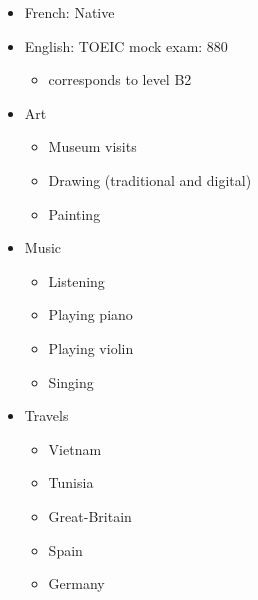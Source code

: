 \documentclass[a4paper,table]{twentysecondcv}
\begin{document}
{  \begin{itemize}[leftmargin=1mm]
    \setlength\itemsep{-5pt}
    \item French: Native
    \item English: TOEIC mock exam: 880
      \vspace{-5pt}
    \begin{itemize}
      \setlength\itemsep{-5pt}
      \item corresponds to level B2
    \end{itemize}
  \end{itemize}
  \begin{flushleft}
  \begin{itemize}[leftmargin=1mm]
    \setlength\itemsep{-5pt}
    \item Art
    \vspace{-5pt}
    \begin{itemize}
      \item Museum visits
      \item Drawing (traditional and digital)
      \item Painting
    \end{itemize}
    \item Music
    \vspace{-5pt}
    \begin{itemize}
      \setlength\itemsep{-5pt}
      \item Listening
      \item Playing piano
      \item Playing violin
      \item Singing
    \end{itemize}
    \item Travels
    \vspace{-5pt}
    \begin{itemize}
      \setlength\itemsep{-5pt}
      \item Vietnam
      \item Tunisia
      \item Great-Britain
      \item Spain
      \item Germany
    \end{itemize}
  \end{itemize}
  \end{flushleft}
}

\makeprofile{}

\vspace{-0.1cm}
\begin{center}
\end{center}
\vspace{-0.1cm}
\end{document}
